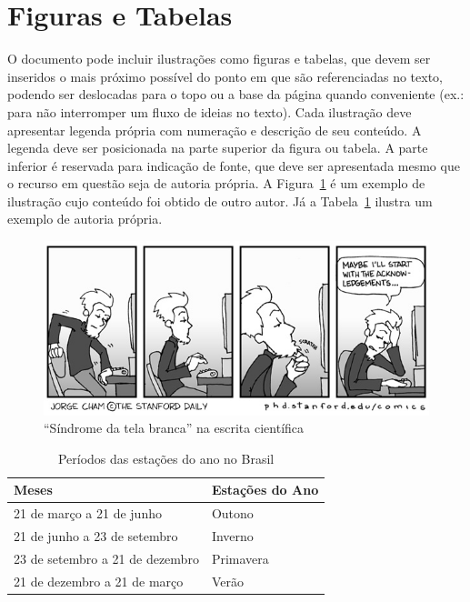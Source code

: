 \documentclass{ifsultcc}
\begin{document}
\section{Figuras e Tabelas}
O documento pode incluir ilustrações como figuras e tabelas, que devem ser inseridos o mais próximo possível do ponto em que são referenciadas no texto, podendo ser deslocadas para o topo ou a base da página quando conveniente (ex.: para não interromper um fluxo de ideias no texto).  Cada ilustração deve apresentar legenda própria com numeração e descrição de seu conteúdo.  A legenda deve ser posicionada na parte superior da figura ou tabela.  A parte inferior é reservada para indicação de fonte, que deve ser apresentada mesmo que o recurso em questão seja de autoria própria.  A Figura~\ref{fig:escrita} é um exemplo de ilustração cujo conteúdo foi obtido de outro autor.  Já a Tabela~\ref{tab:estacoes} ilustra um exemplo de autoria própria.  

\begin{figure}[h]
	\caption{``Síndrome da tela branca'' na escrita científica}
	\label{fig:escrita}
	\centering%
	\begin{minipage}{.8\textwidth}
		\includegraphics[width=\textwidth]{escrita}
	\end{minipage}
\end{figure}

\begin{table}[h]
	\caption{Períodos das estações do ano no Brasil}
	\label{tab:estacoes}
	\centering%
	\begin{minipage}{.6\textwidth}
		\begin{tabular*}{\textwidth}{ll}
			\hline
			\textbf{Meses} & \textbf{Estações do Ano}\\
			\hline
			21 de março a 21 de junho & Outono\\
			21 de junho a 23 de setembro & Inverno\\
			23 de setembro a 21 de dezembro & Primavera\\
			21 de dezembro a 21 de março & Verão\\
			\hline
		\end{tabular*}
	\end{minipage}
\end{table}
\end{document}
